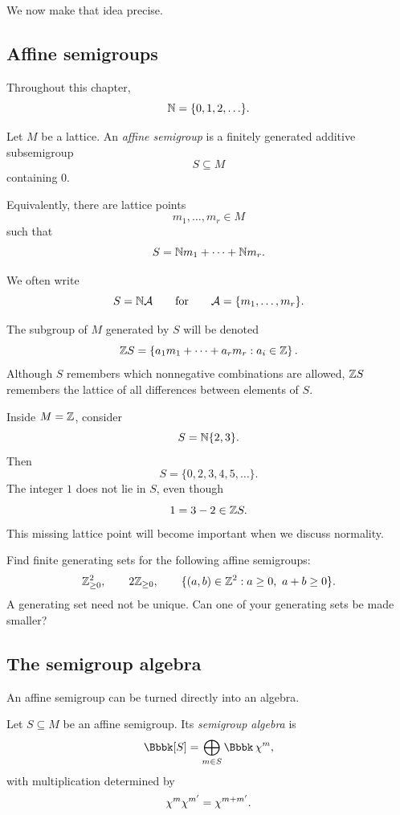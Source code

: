 We now make that idea precise.

\subsection{Affine semigroups}

Throughout this chapter,
\[
\mathbb{N}=\{0,1,2,\ldots\}.
\]

\begin{definition}
Let \(M\) be a lattice. An \emph{affine semigroup} is a finitely
generated additive subsemigroup
\[
S\subseteq M
\]
containing \(0\).

Equivalently, there are lattice points
\[
m_1,\ldots,m_r\in M
\]
such that
\[
S
=
\mathbb{N} m_1+\cdots+\mathbb{N} m_r.
\]
\end{definition}

We often write
\[
S=\mathbb{N}\mathcal A
\qquad\text{for}\qquad
\mathcal A=\{m_1,\ldots,m_r\}.
\]

The subgroup of \(M\) generated by \(S\) will be denoted
\[
\mathbb{Z} S
=
\left\{
a_1m_1+\cdots+a_rm_r:
a_i\in\mathbb{Z}
\right\}.
\]
Although \(S\) remembers which nonnegative combinations are allowed,
\(\mathbb{Z} S\) remembers the lattice of all differences between elements
of \(S\).

\begin{example}
Inside \(M=\mathbb{Z}\), consider
\[
S=\mathbb{N}\{2,3\}.
\]
Then
\[
S=\{0,2,3,4,5,\ldots\}.
\]
The integer \(1\) does not lie in \(S\), even though
\[
1=3-2\in\mathbb{Z} S.
\]
This missing lattice point will become important when we discuss
normality.
\end{example}

\begin{pauseandthink}
Find finite generating sets for the following affine semigroups:
\[
\mathbb{Z}_{\geq0}^2,
\qquad
2\mathbb{Z}_{\geq0},
\qquad
\{(a,b)\in\mathbb{Z}^2:a\geq0,\ a+b\geq0\}.
\]
A generating set need not be unique. Can one of your generating sets
be made smaller?
\end{pauseandthink}

\subsection{The semigroup algebra}

An affine semigroup can be turned directly into an algebra.

\begin{definition}
Let \(S\subseteq M\) be an affine semigroup. Its \emph{semigroup
algebra} is
\[
\Bbbk[S]
=
\bigoplus_{m\in S}\Bbbk\,\character{m},
\]
with multiplication determined by
\[
\chi^{m}\chi^{m'}
=
\chi^{m+m'}.
\]
\end{definition}

